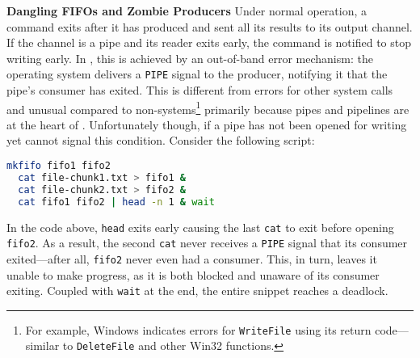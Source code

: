 \documentclass[letterpaper,twocolumn,10pt]{article}
\newcommand{\heading}[1]{\vspace{4pt}\noindent\textbf{#1}\enspace}
\newcommand{\ttt}[1]{\texttt{#1}}
\newcommand{\TODO}[1]{\hl{\textbf{TODO:} #1}\xspace}
\newcommand{\nv}[1]{[{\color{cyan}nv: #1}]}
\newcommand{\kk}[1]{[{\color{magenta}kk: #1}]}
\begin{document}
\heading{Dangling FIFOs and Zombie Producers}
%
%
Under normal operation, a command exits after it has produced and sent all its results to its output channel.
If the channel is a pipe and its reader exits early, the command is notified to stop writing early.
In \unix, this is achieved by an out-of-band error mechanism: the
operating system delivers a \ttt{PIPE} signal to the producer,
notifying it that the pipe's consumer has exited.  This is different
from errors for other system calls
and unusual compared to non-\unix systems\footnote{For example,
  Windows indicates errors for \ttt{WriteFile} using its return
  code---similar to \ttt{DeleteFile} and other Win32 functions.}
primarily because pipes and pipelines are at the heart of \unix.
Unfortunately though, if a pipe has not been opened for writing yet
  \unix cannot signal this condition.
Consider the following script:
\begin{lstlisting}[language=sh, numbers=none]
  mkfifo fifo1 fifo2
  cat file-chunk1.txt > fifo1 &
  cat file-chunk2.txt > fifo2 &
  cat fifo1 fifo2 | head -n 1 & wait
\end{lstlisting}
\noindent
In the code above, \ttt{head} exits early causing the last \ttt{cat} to exit before opening \ttt{fifo2}.
As a result, the second \ttt{cat} never receives a \ttt{PIPE} signal that its consumer exited---after all, \ttt{fifo2} never even had a consumer.
This, in turn, leaves it unable to make progress, as it is both blocked and unaware of its consumer exiting.
Coupled with \ttt{wait} at the end, the entire snippet reaches a deadlock.
\end{document}
